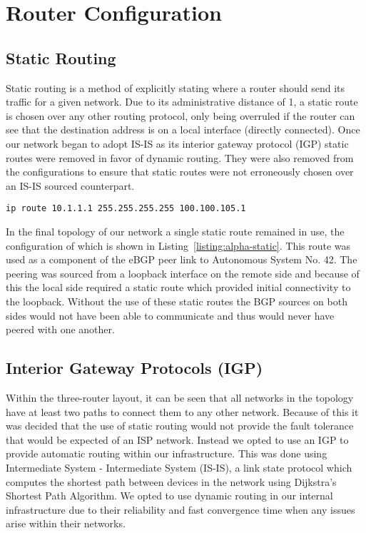 \chapter{Router Configuration}
\section{Static Routing}
Static routing is a method of explicitly stating where a router should send its
traffic for a given network. Due to its administrative distance of 1, a static
route is chosen over any other routing protocol, only being overruled if the
router can see that the destination address is on a local interface (directly
connected). Once our network began to adopt IS-IS as its interior gateway
protocol (IGP) static routes were removed in favor of dynamic routing. They
were also removed from the configurations to ensure that static routes were not
erroneously chosen over an IS-IS sourced counterpart.

\begin{lstlisting}[caption={Alpha Static Route}, label={listing:alpha-static}]
ip route 10.1.1.1 255.255.255.255 100.100.105.1
\end{lstlisting}

In the final topology of our network a single static route remained in use, the
configuration of which is shown in Listing~\ref{listing:alpha-static}. This
route was used as a component of the eBGP peer link to Autonomous System No.
42. The peering was sourced from a loopback interface on the remote side and
    because of this the local side required a static route which provided
    initial connectivity to the loopback. Without the use of these static
    routes the BGP sources on both sides would not have been able to
    communicate and thus would never have peered with one another.

\section{Interior Gateway Protocols (IGP)}
Within the three-router layout, it can be seen that all networks in the topology
have at least two paths to connect them to any other network. Because of this
it was decided that the use of static routing would not provide the fault
tolerance that would be expected of an ISP network. Instead we opted to use an
IGP to provide automatic routing within our infrastructure. This was done using
Intermediate System - Intermediate System (IS-IS), a link state protocol which
computes the shortest path between devices in the network using Dijkstra's
Shortest Path Algorithm. We opted to use dynamic routing in our internal
infrastructure due to their reliability and fast convergence time when any
issues arise within their networks.

